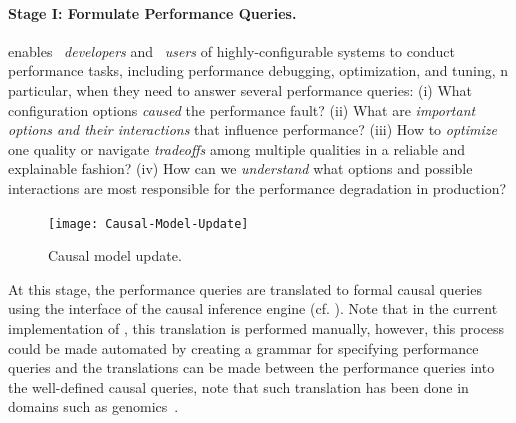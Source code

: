 \smallskip
\noindent
\paragraph{Stage I: Formulate Performance Queries.}
\ourapproach enables ~\textit{developers} and ~\textit{users} of highly-configurable systems to conduct performance tasks, including performance debugging, optimization, and tuning, n particular, when they need to answer several performance queries:
(i) What configuration options \emph{caused} the performance fault? (ii) What are \emph{important options and their interactions} that influence performance? (iii) How to \emph{optimize} one quality or navigate \textit{tradeoffs} among multiple qualities in a reliable and explainable fashion? (iv) How can we \emph{understand} what options and possible interactions are most responsible for the performance degradation in production? 


\begin{figure}[tp!]
    \centering
    \texttt{[image: Causal-Model-Update]}
    \caption{\small {Causal model update.}}
    
    \label{fig:causal_model_update}
\end{figure}

At this stage, the performance queries are translated to formal causal queries using the interface of the causal inference engine (cf. ). Note that in the current implementation of \ourapproach, this translation is performed manually, however, this process could be made automated by creating a grammar for specifying performance queries and the translations can be made between the performance queries into the well-defined causal queries, note that such translation has been done in domains such as genomics~\cite{farahmand2019causal}.  %





